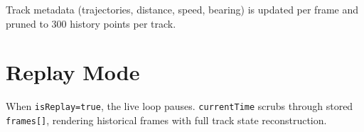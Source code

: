 Track metadata (trajectories, distance, speed, bearing) is updated per frame and pruned to 300 history points per track.

\section{Replay Mode}
\label{sec:replay}

When \texttt{isReplay=true}, the live loop pauses. \texttt{currentTime} scrubs through stored \texttt{frames[]}, rendering historical frames with full track state reconstruction.